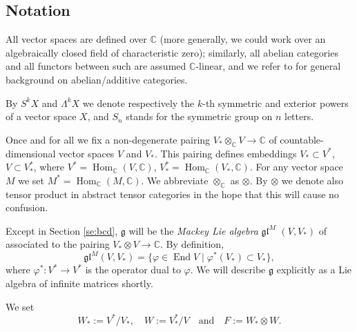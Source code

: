 \documentclass[11pt]{article}
\theoremstyle{plain}
\theoremstyle{nonumberplain}
\theoremstyle{plain}
\newtheorem{notation}[lemma]{Notation}
\numberwithin{equation}{section}
\theoremstyle{nonumberplain}
\newcommand\bC{{\mathbb C}}
\newcommand\cC{{\mathcal C}}
\newcommand\fg{{\mathfrak g}}
\newcommand\fgl{\mathfrak{gl}}
\newcommand\1{{\bf 1}}
\DeclareMathOperator{\End}{\mathrm{End}}
\DeclareMathOperator{\Hom}{\mathrm{Hom}}
\DeclareMathOperator{\ot}{\leftarrow}
\begin{document}
\subsection{Notation}
All vector spaces are defined over $\bC$ (more generally, we could work over an algebraically closed field of characteristic zero); similarly, all abelian categories and all functors between such are assumed $\bC$-linear, and we refer to \cite{groth} for general background on abelian/additive categories.


By $S^k X$ and $\Lambda^k X$ we denote respectively the $k$-th symmetric and exterior powers of a vector space $X$, and $S_n$ stands for the symmetric group on $n$ letters.

Once and for all we fix a non-degenerate pairing $V_*\otimes_{\bC} V\rightarrow \bC$ of countable-dimensional vector spaces $V$ and $V_*$. This pairing defines embeddings $V_*\subset V^*$, $V\subset V^*_*$, where $V^*=\Hom_{\bC}(V,\bC)$, $V_*^*=\Hom_{\bC}(V_*,\bC)$. For any vector space $M$ we set $M^*=\Hom_{\bC}(M,\bC)$. We abbreviate $\otimes_{\bC}$ as $\otimes$. By $\otimes$ we denote also tensor product in abstract tensor categories in the hope that this will cause no confusion.

Except in Section \ref{se:bcd}, $\fg$ will be the {\it Mackey Lie algebra} $\fgl^M$ {$(V,V_*)$} of \cite{PS2} associated to the pairing $V_*\otimes V\to \bC$. By definition, $$\fgl^M(V,V_*)=\{ \varphi\in \End V \mid \varphi^*(V_*)\subset V_*\},$$ where $\varphi^*:V^*\rightarrow V^*$ is the operator dual to $\varphi$. We will describe $\fg$ explicitly as a Lie algebra of infinite matrices shortly. 

We set
\begin{equation*}
  W_*:=V^*/V_*,\quad W := V_*^*/V\quad\text{and}\quad F:=W_*\otimes W.  
\end{equation*}
\end{document}
